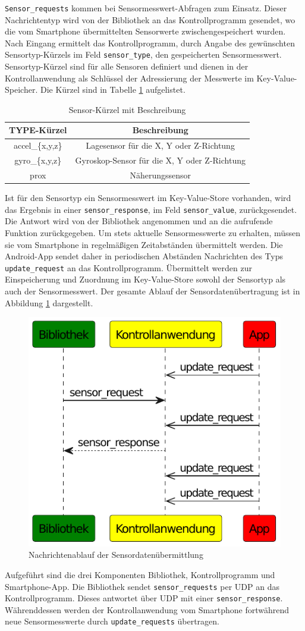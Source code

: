 \documentclass[11pt,a4paper]{report}
\begin{document}
\texttt{Sensor\_requests} kommen bei Sensormesswert-Abfragen zum Einsatz.
Dieser Nachrichtentyp wird von der Bibliothek an das Kontrollprogramm gesendet, wo die vom Smartphone übermittelten Sensorwerte zwischengespeichert wurden.
Nach Eingang ermittelt das Kontrollprogramm, durch Angabe des gewünschten Sensortyp-Kürzels im Feld \texttt{sensor\_type}, den gespeicherten Sensormesswert.
Sensortyp-Kürzel sind für alle Sensoren definiert und dienen in der Kontrollanwendung als Schlüssel der Adressierung der Messwerte im Key-Value-Speicher.
Die Kürzel sind in Tabelle \ref{tab:sensor_types} aufgelistet. 
\begin{table}[htbp]
  \centering
  \begin{tabular}{|c|c|}
      \hline
      \textbf{TYPE-Kürzel} & \textbf{Beschreibung} \\
      \hline
      accel\_\{x,y,z\} & Lagesensor für die X, Y oder Z-Richtung \\
      \hline
       gyro\_\{x,y,z\} & Gyroskop-Sensor für die X, Y oder Z-Richtung \\
      \hline
      prox & Näherungssensor \\
      \hline
  \end{tabular}
  \caption{Sensor-Kürzel mit Beschreibung}
  \label{tab:sensor_types}
\end{table}
Ist für den Sensortyp ein Sensormesswert im Key-Value-Store vorhanden, wird das Ergebnis in einer \texttt{sensor\_response}, im Feld \texttt{sensor\_value}, zurückgesendet.
Die Antwort wird von der Bibliothek angenommen und an die aufrufende Funktion zurückgegeben.
Um stets aktuelle Sensormesswerte zu erhalten, müssen sie vom Smartphone in regelmäßigen Zeitabständen übermittelt werden.
Die Android-App sendet daher in periodischen Abständen Nachrichten des Typs \texttt{update\_request} an das Kontrollprogramm.
Übermittelt werden zur Einspeicherung und Zuordnung im Key-Value-Store sowohl der Sensortyp als auch der Sensormesswert.
Der gesamte Ablauf der Sensordatenübertragung ist in Abbildung \ref{fig:message_flow_requests} dargestellt.
\begin{figure}[htbp]
\centering
\includegraphics[width=.5\textwidth]{images/message_flow_sensor}
\caption{Nachrichtenablauf der Sensordatenübermittlung}
\label{fig:message_flow_requests}
\end{figure}
Aufgeführt sind die drei Komponenten Bibliothek, Kontrollprogramm und Smartphone-App.
Die Bibliothek sendet \texttt{sensor\_requests} per UDP an das Kontrollprogramm.
Dieses antwortet über UDP mit einer \texttt{sensor\_response}.
Währenddessen werden der Kontrollanwendung vom Smartphone fortwährend neue Sensormesswerte durch \texttt{update\_requests} übertragen.
\end{document}
